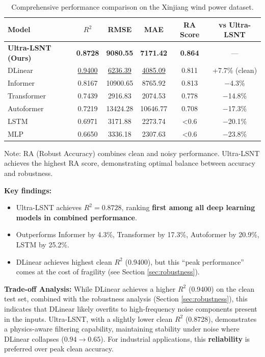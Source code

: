 \documentclass[review,3p,times,draft]{elsarticle}
\begin{document}
\begin{table}[htbp]
\centering
\caption{Comprehensive performance comparison on the Xinjiang wind power dataset.}
\label{tab:main_results}
\begin{tabular}{@{}lccccc@{}}
\toprule
\textbf{Model} & \textbf{$R^2$} & \textbf{RMSE} & \textbf{MAE} & \textbf{RA Score} & \textbf{vs Ultra-LSNT} \\
\midrule
\textbf{Ultra-LSNT (Ours)} & \textbf{0.8728} & \textbf{9080.55} & \textbf{7171.42} & \textbf{0.864} & --- \\
DLinear & \underline{0.9400} & \underline{6236.39} & \underline{4085.09} & 0.811 & +7.7\% (clean) \\
Informer & 0.8167 & 10900.65 & 8765.92 & 0.813 & $-$4.3\% \\
Transformer & 0.7439 & 2916.83 & 2074.53 & 0.778 & $-$14.8\% \\
Autoformer & 0.7219 & 13424.28 & 10646.77 & 0.708 & $-$17.3\% \\
LSTM & 0.6971 & 3171.88 & 2273.74 & <0.6 & $-$20.1\% \\
MLP & 0.6650 & 3336.18 & 2307.63 & <0.6 & $-$23.8\% \\
\bottomrule
\end{tabular}
\begin{tablenotes}
\small
\item Note: RA (Robust Accuracy) combines clean and noisy performance. Ultra-LSNT achieves the highest RA score, demonstrating optimal balance between accuracy and robustness.
\end{tablenotes}
\end{table}

\textbf{Key findings:}
\begin{itemize}[leftmargin=*]
    \item Ultra-LSNT achieves $R^2=0.8728$, ranking \textbf{first among all deep learning models in combined performance}.
    \item Outperforms Informer by 4.3\%, Transformer by 17.3\%, Autoformer by 20.9\%, LSTM by 25.2\%.
    \item DLinear achieves highest clean $R^2$ (0.9400), but this ``peak performance'' comes at the cost of fragility (see Section \ref{sec:robustness}).
\end{itemize}

\textbf{Trade-off Analysis:} While DLinear achieves a higher $R^2$ (0.9400) on the clean test set, combined with the robustness analysis (Section \ref{sec:robustness}), this indicates that DLinear likely overfits to high-frequency noise components present in the inputs. Ultra-LSNT, with a slightly lower clean $R^2$ (0.8728), demonstrates a physics-aware filtering capability, maintaining stability under noise where DLinear collapses ($0.94 \to 0.65$). For industrial applications, this \textbf{reliability} is preferred over peak clean accuracy.
\end{document}
